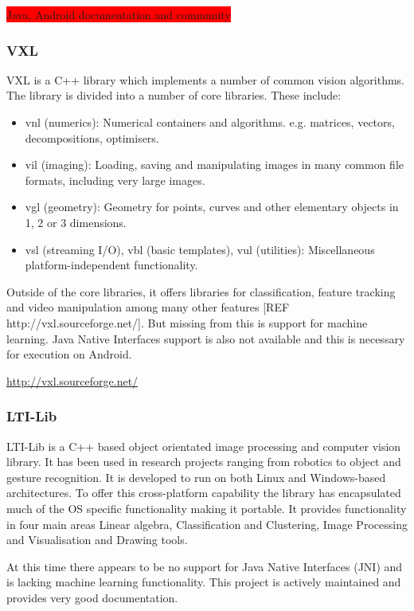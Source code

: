 \colorbox{red}{Java, Android documentation and community}

\subsubsection{VXL}
VXL is a C++ library which implements a number of common vision algorithms. The library is divided into a number of core libraries. These include: 

\begin{itemize}
\item vnl (numerics): Numerical containers and algorithms. e.g. matrices, vectors, decompositions, optimisers.
\item vil (imaging): Loading, saving and manipulating images in many common file formats, including very large images.
\item vgl (geometry): Geometry for points, curves and other elementary objects in 1, 2 or 3 dimensions.
\item vsl (streaming I/O), vbl (basic templates), vul (utilities): Miscellaneous platform-independent functionality.
\end{itemize}

Outside of the core libraries, it offers libraries for classification, feature tracking and video manipulation among many other features [REF http://vxl.sourceforge.net/]. But missing from this is support for machine learning. Java Native Interfaces support is also not available and this is necessary for execution on Android.

\url{http://vxl.sourceforge.net/}


\subsubsection{LTI-Lib}
LTI-Lib is a C++ based object orientated image processing and computer vision library. It has been used in research projects ranging from robotics to object and gesture recognition. It is developed to run on both Linux and Windows-based architectures. To offer this cross-platform capability the library has encapsulated much of the OS specific functionality making it portable. It provides functionality in four main areas Linear algebra, Classification and Clustering, Image Processing and Visualisation and Drawing tools.

At this time there appears to be no support for Java Native Interfaces (JNI) and is lacking machine learning functionality. This project is actively maintained and provides very good documentation.
 
